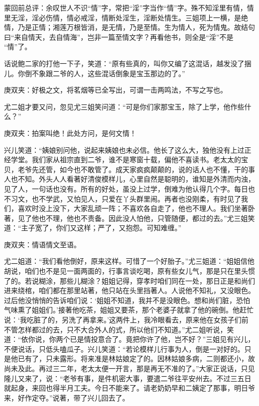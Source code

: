 
\begin{parag}
    \begin{note}蒙回前总评：余叹世人不识“情”字，常把“淫”字当作“情”字。殊不知淫里有情，情里无淫，淫必伤情，情必戒淫，情断处淫生，淫断处情生。三姐项上一横，是绝情，乃是正情；湘莲万根皆消，是无情，乃是至情。生为情人，死为情鬼。故结句曰“来自情天，去自情海”，岂非一篇至情文字？再看他书，则全是“淫”不是 “情”了。\end{note}
\end{parag}


\begin{parag}
    话说鲍二家的打他一下子，笑道：“原有些真的，叫你又编了这混话，越发没了捆儿。你倒不象跟二爷的人，这些混话倒象是宝玉那边的了。”\begin{note}庚双夹：好极之文，将茗烟等已全写出，可谓一击两鸣法，不写之写也。\end{note}尤二姐才要又问，忽见尤三姐笑问道：“可是你们家那宝玉，除了上学，他作些什么？”\begin{note}庚双夹：拍案叫绝！此处方问，是何文情！\end{note}兴儿笑道：“姨娘别问他，说起来姨娘也未必信。他长了这么大，独他没有上过正经学堂。我们家从祖宗直到二爷，谁不是寒窗十载，偏他不喜读书。老太太的宝贝，老爷先还管，如今也不敢管了。成天家疯疯颠颠的，说的话人也不懂，干的事人也不知。外头人人看著好清俊模样儿，心里自然是聪明的，谁知是外清而内浊，见了人，一句话也没有。所有的好处，虽没上过学，倒难为他认得几个字。每日也不习文，也不学武，又怕见人，只爱在丫头群里闹。再者也没刚柔，有时见了我们，喜欢时没上没下，大家乱顽一阵；不喜欢各自走了，他也不理人。我们坐著卧著，见了他也不理，他也不责备。因此没人怕他，只管随便，都过的去。”尤三姐笑道：“主子宽了，你们又这样；严了，又抱怨。可知难缠。”\begin{note}庚双夹：情语情文至语。\end{note}尤二姐道：“我们看他倒好，原来这样。可惜了一个好胎子。”尤三姐道：“姐姐信他胡说，咱们也不是见一面两面的，行事言谈吃喝，原有些女儿气，那是只在里头惯了的。若说糊涂，那些儿糊涂？姐姐记得，穿孝时咱们同在一处，那日正是和尚们进来绕棺，咱们都在那里站著，他只站在头里挡著人。人说他不知礼，又没眼色。过后他没悄悄的告诉咱们说：‘姐姐不知道，我并不是没眼色。想和尚们脏，恐怕气味熏了姐姐们。’接著他吃茶，姐姐又要茶，那个老婆子就拿了他的碗倒。他赶忙说：‘我吃脏了的，另洗了再拿来。’这两件上，我冷眼看去，原来他在女孩子们前不管怎样都过的去，只不大合外人的式，所以他们不知道。”尤二姐听说，笑道：“依你说，你两个已是情投意合了。竟把你许了他，岂不好？”三姐见有兴儿，不便说话，只低头嗑瓜子。兴儿笑道：“若论模样儿行事为人，倒是一对好的。只是他已有了，只未露形。将来准是林姑娘定了的。因林姑娘多病，二则都还小，故尚未及此。再过三二年，老太太便一开言，那是再无不准的了。”大家正说话，只见隆儿又来了，说：“老爷有事，是件机密大事，要遣二爷往平安州去。不过三五日就起身，来回也得半月工夫。今日不能来了。请老奶奶早和二姨定了那事，明日爷来，好作定夺。”说著，带了兴儿回去了。
\end{parag}


